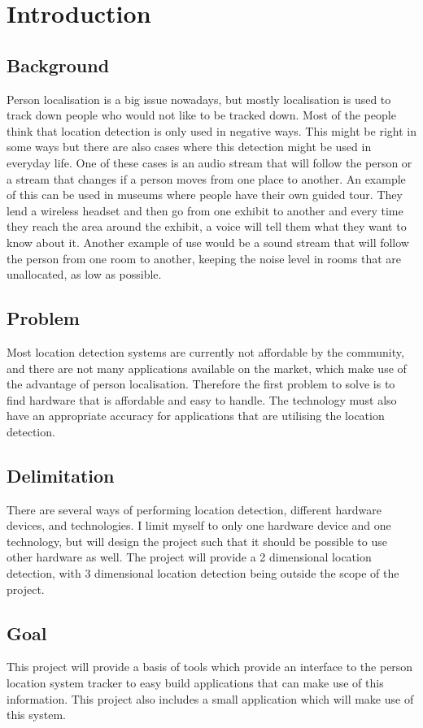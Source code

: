 \chapter{Introduction}

\section{Background}
 Person localisation is a big issue nowadays, but mostly localisation is used to track down people who would not like to be tracked down. Most of the people think that location detection is only used in negative ways. This might be right in some ways but there are also cases where this detection might be used in everyday life. One of these cases is an audio stream that will follow the person or a stream that changes if a person moves from one place to another. An example of this can be used in museums where people have their own guided tour. They lend a wireless headset and then go from one exhibit to another and every time they reach the area around the exhibit, a voice will tell them what they want to know about it. Another example of use would be a sound stream that will follow the person from one room to another, keeping the noise level in rooms that are unallocated, as low as possible.

\section{Problem}
 Most location detection systems are currently not affordable by the community, and there are not many applications available on the market, which make use of the advantage of person localisation. Therefore the first problem to solve is to find hardware that is affordable and easy to handle. The technology must also have an appropriate accuracy for applications that are utilising the location detection.

\section{Delimitation}
 There are several ways of performing location detection, different hardware devices, and technologies. I limit myself to only one hardware device and one technology, but will design the project such that it should be possible to use other hardware as well. The project will provide a 2 dimensional location detection, with 3 dimensional location detection being outside the scope of the project.

\section{Goal}
 This project will provide a basis of tools which provide an interface to the person location system tracker to easy build applications that can make use of this information. This project also includes a small application which will make use of this system.
